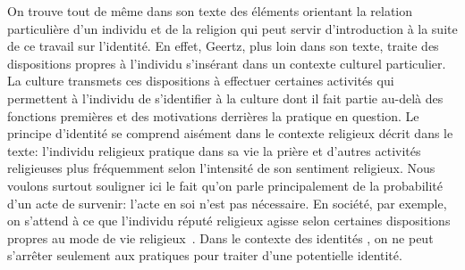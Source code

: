 On trouve tout de même dans son texte des éléments orientant la relation particulière d'un individu et de la religion qui peut servir d'introduction à la suite de ce travail sur l'identité.
En effet, Geertz, plus loin dans son texte, traite des dispositions propres à l'individu s'insérant dans un contexte culturel particulier.
La culture transmets ces dispositions à effectuer certaines activités qui permettent à l'individu de s'identifier à la culture dont il fait partie au-delà des fonctions premières et des motivations derrières la pratique en question.
Le principe d'identité se comprend aisément dans le contexte religieux décrit dans le texte: l'individu religieux pratique dans sa vie la prière et d'autres activités religieuses plus fréquemment selon l'intensité de son sentiment religieux.
Nous voulons surtout souligner ici le fait qu'on parle principalement de la probabilité d'un acte de survenir: l'acte en soi n'est pas nécessaire.
En société, par exemple, on s'attend à ce que l'individu réputé religieux agisse selon certaines dispositions propres au mode de vie religieux~\citep[28--30]{Geertz1972}.
Dans le contexte des identités \lgbt{}, on ne peut s'arrêter seulement aux pratiques pour traiter d'une potentielle identité.

